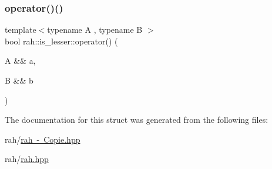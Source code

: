 \mbox{\label{structrah_1_1is__lesser_a250017bbf05b42571b4846f3c0695a8d}} 
\subsubsection{\texorpdfstring{operator()()}{operator()()}\hspace{0.1cm}{\footnotesize\ttfamily [2/2]}}
{\footnotesize\ttfamily template$<$typename A , typename B $>$ \\
bool rah\+::is\+\_\+lesser\+::operator() (\begin{DoxyParamCaption}\item[{A \&\&}]{a,  }\item[{B \&\&}]{b }\end{DoxyParamCaption})\hspace{0.3cm}{\ttfamily [inline]}}



The documentation for this struct was generated from the following files\+:\begin{DoxyCompactItemize}
\item 
rah/\mbox{\hyperlink{rah_01-_01_copie_8hpp}{rah -\/ Copie.\+hpp}}\item 
rah/\mbox{\hyperlink{rah_8hpp}{rah.\+hpp}}\end{DoxyCompactItemize}
